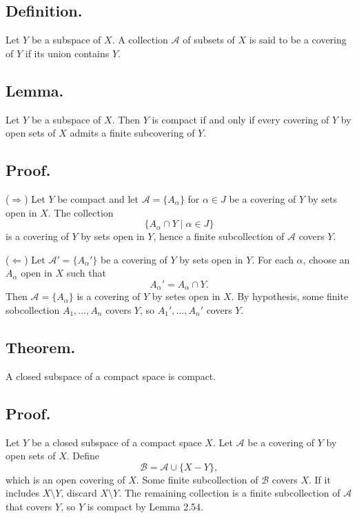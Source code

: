 \documentclass[titlepage]{article}
\begin{document}
\subsection{Definition.} Let $Y$ be a subspace of $X$. A collection $\mathcal{A}$ of subsets of $X$ is said to be a covering of $Y$ if its union contains $Y$.

\subsection{Lemma.} Let $Y$ be a subspace of $X$. Then $Y$ is compact if and only if every covering of $Y$ by open sets of $X$ admits a finite subcovering of $Y$.

\subsection{Proof.} 

($\Rightarrow$) Let $Y$ be compact and let $\mathcal{A} = \{A_{\alpha}\}$ for $\alpha \in J$ be a covering of $Y$ by sets open in $X$. The collection 
$$\{A_{\alpha} \cap Y \mid \alpha \in J\}$$
is a covering of $Y$ by sets open in $Y$, hence a finite subcollection of $\mathcal{A}$ covers $Y$.

($\Leftarrow$) Let $\mathcal{A}' = \{A_{\alpha}'\}$ be a covering of $Y$ by sets open in $Y$. For each $\alpha$, choose an $A_{\alpha}$ open in $X$ such that 
$$A_{\alpha}' = A_{\alpha} \cap Y.$$
Then $\mathcal{A} = \{A_{\alpha}\}$ is a covering of $Y$ by setes open in $X$. By hypothesis, some finite sobcollection $A_{1}, \ldots, A_{n}$ covers $Y$, so $A_{1}', \ldots, A_{n}'$ covers $Y$.

\subsection{Theorem.} A closed subspace of a compact space is compact.

\subsection{Proof.} Let $Y$ be a closed subspace of a compact space $X$. Let $\mathcal{A}$ be a covering of $Y$ by open sets of $X$. Define 
$$\mathcal{B} = \mathcal{A} \cup \{X - Y\},$$
which is an open covering of $X$. Some finite subcollection of $\mathcal{B}$ covers $X$. If it includes $X \setminus Y$, discard $X \setminus Y$. The remaining collection is a finite subcollection of $\mathcal{A}$ that covers $Y$, so $Y$ is compact by Lemma 2.54.
\end{document}
